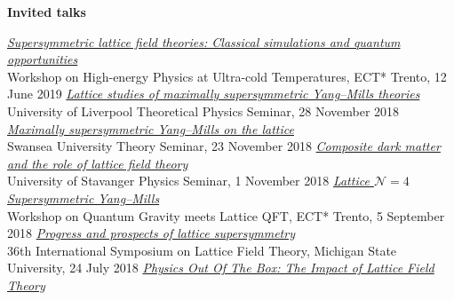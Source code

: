 \renewenvironment{spacelist} {
  \begin{list} {} {
    \setlength{\topsep}{-8 pt}
    \setlength{\itemsep}{5 pt}
    \setlength{\leftmargin}{-1.15 in}
  }
}{
  \end{list}
}

\raggedright
\vspace{12 pt}
\begin{spacelist}
  \item {\large \bfseries Invited talks}
  \begin{revnumerate}
  \setlength{\topsep}{-8 pt}
  \setlength{\itemsep}{10 pt}
  \setlength{\leftmargin}{0 mm}
    \pagebreakitem
      \textit{\href{http://www.davidschaich.net/talks/1906ECT.pdf}{Supersymmetric lattice field theories: Classical simulations and quantum opportunities}} \\
      Workshop on High-energy Physics at Ultra-cold Temperatures, ECT* Trento, 12 June 2019
    \pagebreakitem
      \textit{\href{http://www.davidschaich.net/talks/1811Liverpool.pdf}{Lattice studies of maximally supersymmetric Yang--Mills theories}} \\
      University of Liverpool Theoretical Physics Seminar, 28 November 2018
    \pagebreakitem
      \textit{\href{http://www.davidschaich.net/talks/1811Swansea.pdf}{Maximally supersymmetric Yang--Mills on the lattice}} \\
      Swansea University Theory Seminar, 23 November 2018
    \pagebreakitem
      \textit{\href{http://www.davidschaich.net/talks/1811Stavanger.pdf}{Composite dark matter and the role of lattice field theory}} \\
      University of Stavanger Physics Seminar, 1 November 2018
    \pagebreakitem
      \textit{\href{http://www.davidschaich.net/talks/1809ECT.pdf}{Lattice $\mathcal N = 4$ Supersymmetric Yang--Mills}} \\
      Workshop on Quantum Gravity meets Lattice QFT, ECT* Trento, 5 September 2018
    \pagebreakitem
      \textit{\href{http://www.davidschaich.net/talks/1807Lattice.pdf}{Progress and prospects of lattice supersymmetry}} \\
      36th International Symposium on Lattice Field Theory, Michigan State University, 24 July 2018
    \pagebreakitem
      \textit{\href{http://www.davidschaich.net/talks/1807Liverpool.pdf}{Physics Out Of The Box: The Impact of Lattice Field Theory}} \\

\end{revnumerate}
\end{spacelist}
